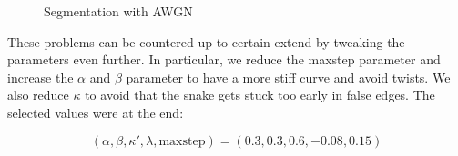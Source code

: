 \begin{figure}[!hbt]


\caption{Segmentation with AWGN}
\label{fig:awgn}
\end{figure}

These problems can be countered up to certain extend by tweaking the parameters even further. In particular, we reduce the maxstep parameter and increase the $\alpha$ and $\beta$ parameter to have a more stiff curve and avoid twists. We also reduce $\kappa$ to avoid that the snake gets stuck too early in false edges. The selected values were at the end:

\[ (\alpha , \beta , \kappa' , \lambda , \mathrm{maxstep} ) = (0.3, 0.3, 0.6, -0.08, 0.15) \]

